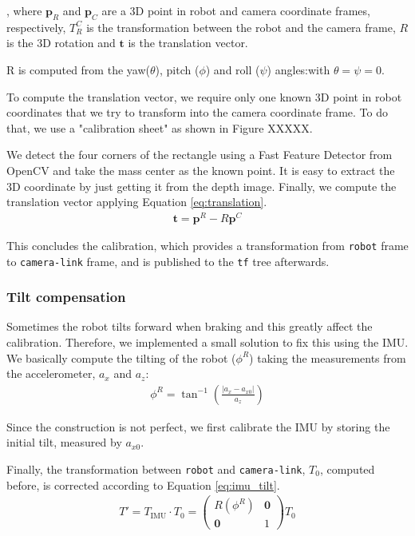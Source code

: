 , where $\textbf{p}_R$ and $\textbf{p}_C$ are a 3D point in robot and camera coordinate frames, respectively, $T_R^C$ is the transformation between the robot and the camera frame, $R$ is the 3D rotation and $\textbf{t}$ is the translation vector. 

R is computed from the yaw($\theta$), pitch ($\phi$) and roll ($\psi$) angles:with $\theta = \psi = 0$.

To compute the translation vector, we require only one known 3D point in robot coordinates that we try to transform into the camera coordinate frame. To do that, we use a "calibration sheet" as shown in Figure XXXXX.


We detect the four corners of the rectangle using a Fast Feature Detector from OpenCV and take the mass center as the known point. It is easy to extract the 3D coordinate by just getting it from the depth image. 
Finally, we compute the translation vector applying Equation \ref{eq:translation}.
\begin{align}
\label{eq:translation}
\textbf{t} = \textbf{p}^R - R \textbf{p}^C
\end{align}

This concludes the calibration, which provides a transformation from \texttt{robot} frame to \texttt{camera-link} frame, and is published to the \texttt{tf} tree afterwards. 

\subsubsection{Tilt compensation}
Sometimes the robot tilts forward when braking and this greatly affect the calibration. Therefore, we implemented a small solution to fix this using the IMU. We basically compute the tilting of the robot ($\phi^R$) taking the measurements from the accelerometer, $a_x$ and $a_z$:
\begin{align}
\phi^R = \tan^{-1} \left(\frac{|a_x - a_{x0}|}{a_z}\right)
\end{align}

Since the construction is not perfect, we first calibrate the IMU by storing the initial tilt, measured by $a_{x0}$. 

Finally, the transformation between \texttt{robot} and \texttt{camera-link}, $T_0$, computed before, is corrected according to Equation \ref{eq:imu_tilt}.
\begin{align}
\label{eq:imu_tilt}
T' = T_{\text{IMU}} \cdot T_0 = 
\begin{pmatrix}
R(\phi^R) & \textbf{0}\\
\textbf{0} & 1 
\end{pmatrix} T_0
\end{align}

